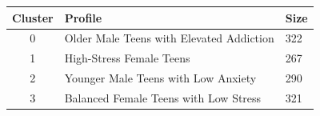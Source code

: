 \documentclass[11pt]{article}
\begin{document}
\begin{center}
\begin{tabular}{cll}
\toprule
\textbf{Cluster} & \textbf{Profile} & \textbf{Size} \\
\midrule
0 & Older Male Teens with Elevated Addiction & 322 \\
1 & High-Stress Female Teens                & 267 \\
2 & Younger Male Teens with Low Anxiety     & 290 \\
3 & Balanced Female Teens with Low Stress   & 321 \\
\bottomrule
\end{tabular}
\end{center}

\vfill

\end{document}
